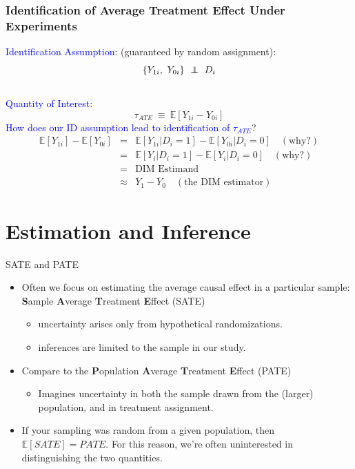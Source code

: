 \documentclass[xcolor=dvipsnames]{beamer}
\renewcommand\r{\right}
\renewcommand\l{\left}
\newcommand\E{\mathbb{E}}
\newcommand\indep{\protect\mathpalette{\protect\independenT}{\perp}}
\def\independenT#1#2{\mathrel{\rlap{$#1#2$}\mkern2mu{#1#2}}}
\begin{document}
\begin{frame}[t]
\frametitle{Identification of Average Treatment Effect Under Experiments}
\small
{} \textcolor{Blue}{Identification Assumption}: (guaranteed by random assignment):
$$ \l\{ Y_{1i}, \ Y_{0i}\r\} \ \indep \ D_i $$ \\

 \textcolor{Blue}{Quantity of Interest}: \\
\vspace{-.2in}
$$ \tau_{ATE} \ \equiv \ \E[Y_{1i} - Y_{0i}]$$
 \textcolor{Blue}{How does our ID assumption lead to identification of $\tau_{ATE}$}?\\
\footnotesize
{} \begin{eqnarray*}
\E[Y_{1i}] - \E[Y_{0i}] &=& \E[Y_{1i}|D_i=1] - \E[Y_{0i} | D_i=0] \quad (\text{why?}) \\
&=& \E[Y_{i}|D_i=1] - \E[Y_{i} | D_i=0]  \quad (\text{why?})\\
&=& \text{DIM Estimand}\\
&\approx & \overline{Y}_1 - \overline{Y}_0   \quad (\text{the DIM estimator})
\end{eqnarray*}
\end{frame}


\section{Estimation and Inference}

\begin{frame}{SATE and PATE}
\begin{itemize}
\itemsep1pt\parskip0pt
\item<1->
 Often we focus on estimating the average causal effect in a
  particular sample: \textbf{S}ample \textbf{A}verage \textbf{T}reatment
  \textbf{E}ffect (SATE)\medskip

  \begin{itemize}
   \item uncertainty arises only from hypothetical randomizations.\medskip
  \item  inferences are limited to the sample in our study.
  \end{itemize}\bigskip
\item<2-> Compare to the \textbf{P}opulation
  \textbf{A}verage \textbf{T}reatment \textbf{E}ffect (PATE)\medskip
 \begin{itemize}
  \item Imagines uncertainty in both the sample drawn from the (larger) population, and in treatment assignment.
  \end{itemize}\bigskip


\item<3->  \small  If your sampling was random from a given population, then $\E[SATE]=PATE$. For this reason, we're often uninterested in distinguishing the two quantities.
\end{itemize}
\end{frame}
\end{document}
